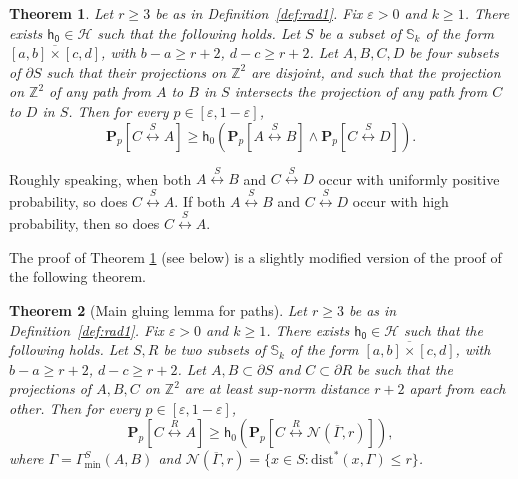 \documentclass[12pt, twoside,a4paper,reqno]{amsart}
\theoremstyle{plain}
\newtheorem{theorem}{Theorem}[section]
\theoremstyle{remark}
\theoremstyle{definition}
\newcommand{\eps}{\varepsilon}
\newcommand{\PP}{\mathbf{P}}
\newcommand{\Pp}[1]{\PP_p \left [ #1 \right ]}
\newcommand{\lr}[1][]{\overset{\:#1\:}\longleftrightarrow}
\newcommand{\ol}{\overline}
\renewcommand{\bar}{\overline}
\begin{document}
\begin{theorem}
  \label{GL0} Let $r\ge3$ be as in Definition~\ref{def:rad1}. Fix $\eps>0$ and
  $k \geq 1$. There exists $\mathsf{h_{0}}\in \mathcal{H}$ such that the
  following holds. Let $S$ be a subset of $\mathds S_{k}$ of the form
  $\ol{[a,b]\times[c,d]}$, with $b-a \geq r+2$, $d-c \geq r+2$. Let $A,B,C,D$ be
  four subsets of $\partial S$ such that their projections on $\mathds{Z}^{2}$
  are disjoint, and such that the projection on $%
  \mathds{Z}^{2}$ of any path from $A$ to $B$ in $S$ intersects the projection
  of any path from $C$ to $D$ in $S$. Then for every $p\in[\eps,1-\eps]$,
\begin{equation}
\label{eq:190}
       \Pp{C\lr[S] A} \ge \mathsf{h}_0( \Pp{A\lr[S] B}\wedge   \Pp{C\lr[S]D}).
  \end{equation}
\end{theorem}

Roughly speaking, when both $A\lr[S] B$ and $C\lr[S]D$ occur with uniformly
positive probability, so does $C\lr[S] A$. If both $A\lr[S] B$ and $C\lr[S]D$
occur with high probability, then so does $C\lr[S] A$.

The proof of Theorem \ref{GL0} (see below) is a slightly modified version of the proof of the following theorem.

\begin{theorem}[Main gluing lemma for paths]
\label{GL}
Let $r\ge 3$ be  as in Definition~\ref{def:rad1}. Fix $\eps>0$ and $k\geq 1$. There
exists $\mathsf{h_{0}}\in \mathcal{H}$ such that the following holds. Let $S, R$ be two subsets of $\mathbb S_k$ of the form $\ol{[a,b]\times[c,d]}$,
with $b-a\geq r+2$, $d-c\geq r+2$. Let $A,B\subset \partial S$ and $C\subset
\partial R$ be such that the projections of $A,B,C$ on $\mathds{Z}^{2}$ are at least sup-norm distance $r+2$ apart from each other. Then for every $p\in[\eps,1-\eps]$,
\begin{equation}
    \label{eq:19}
    \Pp{C\lr[R] A}\ge \mathsf{h}_0( \Pp{C\lr[R] \mathcal{N}(\bar \Gamma, r)}),
  \end{equation}
where $\Gamma=\Gamma_{\mathrm{min}}^S(A,B)$ and $\mathcal{N}(\bar \Gamma, r) = \{ x \in S : \mathrm{dist}^{*}(x, \Gamma) \leq r\}$.
\end{theorem}
\end{document}
